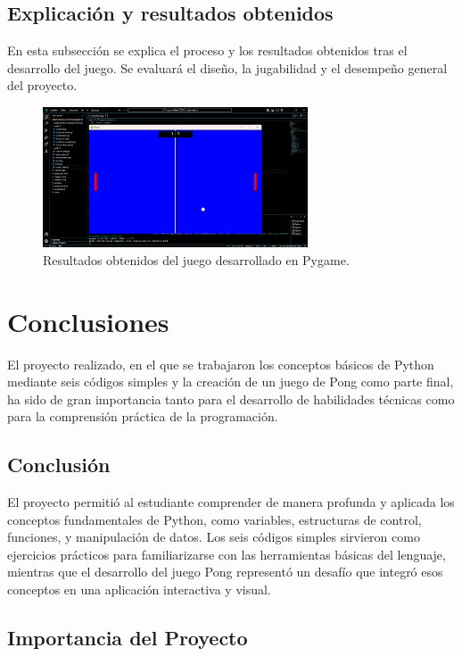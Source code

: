 \documentclass{article}
\begin{document}
\subsection{Explicación y resultados obtenidos}
En esta subsección se explica el proceso y los resultados obtenidos tras el desarrollo del juego. Se evaluará el diseño, la jugabilidad y el desempeño general del proyecto.

\begin{figure}[h!]
    \centering
    \includegraphics[width=0.7\textwidth]{resultados_obtenidos.png} %
    \caption{Resultados obtenidos del juego desarrollado en Pygame.}
    \label{fig:resultados_obtenidos}
\end{figure}

\section*{Conclusiones}

El proyecto realizado, en el que se trabajaron los conceptos básicos de Python mediante seis códigos simples y la creación de un juego de Pong como parte final, ha sido de gran importancia tanto para el desarrollo de habilidades técnicas como para la comprensión práctica de la programación.

\subsection*{Conclusión}

El proyecto permitió al estudiante comprender de manera profunda y aplicada los conceptos fundamentales de Python, como variables, estructuras de control, funciones, y manipulación de datos. Los seis códigos simples sirvieron como ejercicios prácticos para familiarizarse con las herramientas básicas del lenguaje, mientras que el desarrollo del juego Pong representó un desafío que integró esos conceptos en una aplicación interactiva y visual.

\subsection*{Importancia del Proyecto}
\end{document}
